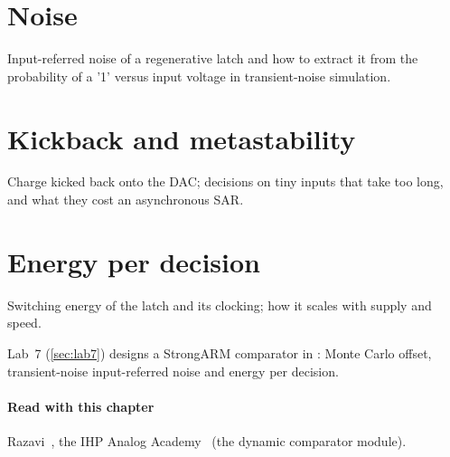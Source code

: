 \section{Noise}\label{sec:ch16-3}
Input-referred noise of a regenerative latch and how to extract it from the probability of a '1' versus input voltage in transient-noise simulation.

\section{Kickback and metastability}\label{sec:ch16-4}
Charge kicked back onto the DAC; decisions on tiny inputs that take too long, and what they cost an asynchronous SAR.

\section{Energy per decision}\label{sec:ch16-5}
Switching energy of the latch and its clocking; how it scales with supply and speed.

\begin{tryit}
Lab~7 (\cref{sec:lab7}) designs a StrongARM comparator in \sgx{}: Monte Carlo offset, transient-noise input-referred noise and energy per decision.
\end{tryit}

\paragraph{Read with this chapter} Razavi~\cite{razavi}, the IHP Analog Academy~\cite{ihpacademy} (the dynamic comparator module).
